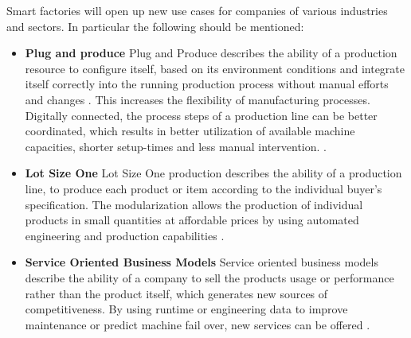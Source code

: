 Smart factories will open up new use cases for companies of various industries and sectors. In particular the following should be mentioned:
\begin{itemize}
    \item[] \textbf{Plug and produce} Plug and Produce describes the ability of a production resource to configure itself, based on its environment conditions and integrate itself correctly into the running production process without manual efforts and changes \cite[p. 146]{Ye20204.0}. This increases the flexibility of manufacturing processes. Digitally connected, the process steps of a production line can be better coordinated, which results in better utilization of available machine capacities, shorter setup-times and less manual intervention. \cite[p. 16]{Acatech2013Recommendations4.0}. 
    \item[] \textbf{Lot Size One} Lot Size One production describes the ability of a production line, to produce each product or item according to the individual buyer's specification. The modularization allows the production of individual products in small quantities at affordable prices by using automated engineering and production capabilities \cite[p. 15]{Acatech2013Recommendations4.0}.
    \item[] \textbf{Service Oriented Business Models} Service oriented business models describe the ability of a company to sell the products usage or performance rather than the product itself, which generates new sources of competitiveness. By using runtime or engineering data to improve maintenance or predict machine fail over, new services can be offered \cite{Bendig2021Equipment-as-a-ServiceIndustry}.
\end{itemize}

